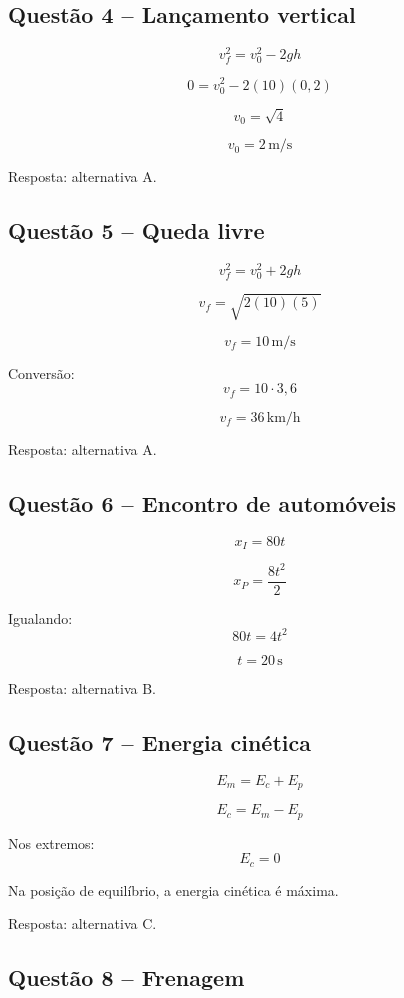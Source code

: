 \documentclass[12pt,a4paper]{article}
\begin{document}
\subsection{Questão 4 -- Lançamento vertical}

\[
v_f^2=v_0^2-2gh
\]

\[
0=v_0^2-2(10)(0,2)
\]

\[
v_0=\sqrt{4}
\]

\[
\boxed{v_0=2\,\mathrm{m/s}}
\]

Resposta: alternativa A.

\subsection{Questão 5 -- Queda livre}

\[
v_f^2=v_0^2+2gh
\]

\[
v_f=\sqrt{2(10)(5)}
\]

\[
v_f=10\,\mathrm{m/s}
\]

Conversão:
\[
v_f=10\cdot3,6
\]

\[
\boxed{v_f=36\,\mathrm{km/h}}
\]

Resposta: alternativa A.

\subsection{Questão 6 -- Encontro de automóveis}

\[
x_I=80t
\]

\[
x_P=\frac{8t^2}{2}
\]

Igualando:
\[
80t=4t^2
\]

\[
t=20\,\mathrm{s}
\]

Resposta: alternativa B.

\subsection{Questão 7 -- Energia cinética}

\[
E_m=E_c+E_p
\]

\[
E_c=E_m-E_p
\]

Nos extremos:
\[
E_c=0
\]

Na posição de equilíbrio, a energia cinética é máxima.

Resposta: alternativa C.

\subsection{Questão 8 -- Frenagem}
\end{document}
